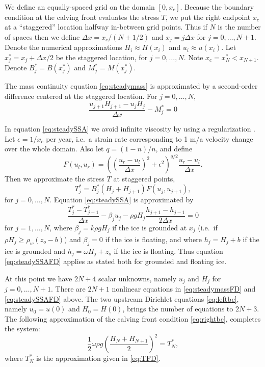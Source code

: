 \documentclass[twocolumn]{igs}
\newcommand{\eps}{\epsilon}
\begin{document}
We define an equally-spaced grid on the domain $[0,x_c]$.  Because the boundary condition at the calving front evaluates the stress $T$, we put the right endpoint $x_c$ at a ``staggered'' location halfway in-between grid points.  Thus if $N$ is the number of spaces then we define $\Delta x = x_c / (N+1/2)$ and $x_j = j\Delta x$ for $j=0,\dots,N+1$.  Denote the numerical approximations $H_i\approx H(x_i)$ and $u_i \approx u(x_i)$.  Let $x_j^* = x_j + \Delta x/2$ be the staggered location, for $j=0,\dots,N$.  Note $x_c = x_N^* < x_{N+1}$.  Denote $B_j^*=B(x_j^*)$ and $M_j^*=M(x_j^*)$.

The mass continuity equation \eqref{eq:steadymass} is approximated by a second-order difference centered at the staggered location.  For $j=0,\dots,N$,
\begin{equation}
\frac{u_{j+1} H_{j+1} - u_j H_j}{\Delta x} - M_j^* = 0 \label{eq:steadymassFD}
\end{equation}

In equation \eqref{eq:steadySSA} we avoid infinite viscosity by using a regularization \citep{SchoofStream}.  Let $\eps=1/x_c$ per year, i.e.~a strain rate corresponding to 1 m$/$a velocity change over the whole domain.  Also let $q = (1-n)/n$, and define
\begin{equation}
F(u_l,u_r) = \left(\left(\frac{u_r-u_l}{\Delta x}\right)^2 + \eps^2\right)^{q/2} \frac{u_r-u_l}{\Delta x}. \label{eq:viscregFD}
\end{equation}
Then we approximate the stress $T$ at staggered points,
\begin{equation}
T_{j}^* = B_j^* \left(H_j + H_{j+1}\right) F(u_j,u_{j+1}), \label{eq:TFD}
\end{equation}
for $j=0,\dots,N$.  Equation \eqref{eq:steadySSA} is approximated by
\begin{equation}
\frac{T_{j}^* - T_{j-1}^*}{\Delta x} - \beta_j u_j - \rho g H_j \frac{h_{j+1} - h_{j-1}}{2 \Delta x} = 0 \label{eq:steadySSAFD}
\end{equation}
for $j=1,\dots,N$, where $\beta_j = k \rho g H_j$ if the ice is grounded at $x_j$ (i.e.~if $\rho H_j \ge \rho_w (z_o - b)$) and $\beta_j=0$ if the ice is floating, and where $h_j = H_j + b$ if the ice is grounded and $h_j = \omega H_j + z_o$ if the ice is floating.  Thus equation \eqref{eq:steadySSAFD} applies as stated both for grounded and floating ice.

At this point we have $2N+4$ scalar unknowns, namely $u_j$ and $H_j$ for $j=0,\dots,N+1$.  There are $2N+1$ nonlinear equations in \eqref{eq:steadymassFD} and \eqref{eq:steadySSAFD} above.  The two upstream Dirichlet equations \eqref{eq:leftbc}, namely $u_0=u(0)$ and $H_0=H(0)$, brings the number of equations to $2N+3$.  The following approximation of the calving front condition \eqref{eq:rightbc}, completes the system:
\begin{equation}
\frac{1}{2} \omega \rho g \left(\frac{H_N + H_{N+1}}{2}\right)^2 = T_N^*, \label{eq:rightbcFD}
\end{equation}
where $T_N^*$ is the approximation given in \eqref{eq:TFD}.
\end{document}

